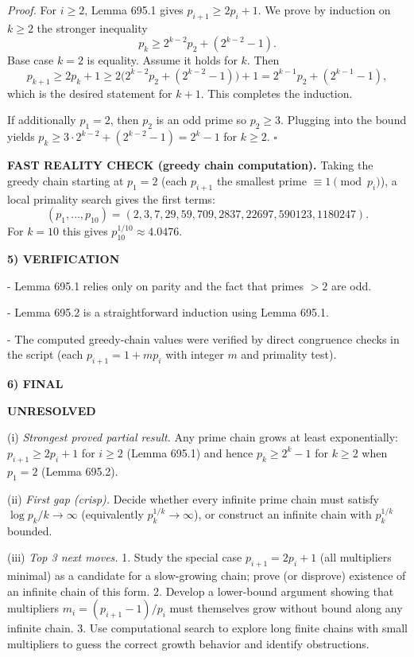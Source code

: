 \smallskip
\noindent\emph{Proof.}
For $i\ge 2$, Lemma 695.1 gives $p_{i+1}\ge 2p_i+1$. We prove by induction on $k\ge 2$ the stronger inequality
\[
 p_k\ge 2^{k-2}p_2 + (2^{k-2}-1).
\]
Base case $k=2$ is equality.
Assume it holds for $k$. Then
\[
 p_{k+1}\ge 2p_k+1\ge 2\big(2^{k-2}p_2 + (2^{k-2}-1)\big)+1=2^{k-1}p_2+(2^{k-1}-1),
\]
which is the desired statement for $k+1$. This completes the induction.

If additionally $p_1=2$, then $p_2$ is an odd prime so $p_2\ge 3$. Plugging into the bound yields $p_k\ge 3\cdot 2^{k-2}+(2^{k-2}-1)=2^k-1$ for $k\ge 2$. \hfill$\square$

\medskip
\noindent\textbf{FAST REALITY CHECK (greedy chain computation).}
Taking the greedy chain starting at $p_1=2$ (each $p_{i+1}$ the smallest prime $\equiv 1\pmod{p_i}$), a local primality search gives the first terms:
\[
( p_1,\dots,p_{10})=(2,3,7,29,59,709,2837,22697,590123,1180247).
\]
For $k=10$ this gives $p_{10}^{1/10}\approx 4.0476$.

\bigskip
\noindent\textbf{5) VERIFICATION}

- Lemma 695.1 relies only on parity and the fact that primes $>2$ are odd.

- Lemma 695.2 is a straightforward induction using Lemma 695.1.

- The computed greedy-chain values were verified by direct congruence checks in the script (each $p_{i+1}=1+m p_i$ with integer $m$ and primality test).

\bigskip
\noindent\textbf{6) FINAL}

\textbf{UNRESOLVED}

(i) \emph{Strongest proved partial result.} Any prime chain grows at least exponentially: $p_{i+1}\ge 2p_i+1$ for $i\ge 2$ (Lemma 695.1) and hence $p_k\ge 2^k-1$ for $k\ge 2$ when $p_1=2$ (Lemma 695.2).

(ii) \emph{First gap (crisp).} Decide whether every infinite prime chain must satisfy $\log p_k/k\to\infty$ (equivalently $p_k^{1/k}\to\infty$), or construct an infinite chain with $p_k^{1/k}$ bounded.

(iii) \emph{Top 3 next moves.}
1. Study the special case $p_{i+1}=2p_i+1$ (all multipliers minimal) as a candidate for a slow-growing chain; prove (or disprove) existence of an infinite chain of this form.
2. Develop a lower-bound argument showing that multipliers $m_i=(p_{i+1}-1)/p_i$ must themselves grow without bound along any infinite chain.
3. Use computational search to explore long finite chains with small multipliers to guess the correct growth behavior and identify obstructions.

